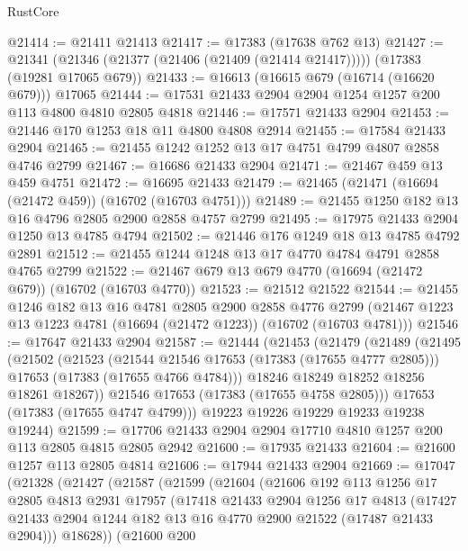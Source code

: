 \begin{lexlean}{RustCore}
\begin{coremodule}
@21414 := @21411 @21413
@21417 := @17383 (@17638 @762 @13)
@21427 := @21341 (@21346 (@21377 (@21406 (@21409 (@21414 @21417))))) (@17383 (@19281 @17065 @679))
@21433 := @16613 (@16615 @679 (@16714 (@16620 @679))) @17065
@21444 := @17531 @21433 @2904 @2904 @1254 @1257 @200 @113 @4800 @4810 @2805 @4818
@21446 := @17571 @21433 @2904
@21453 := @21446 @170 @1253 @18 @11 @4800 @4808 @2914
@21455 := @17584 @21433 @2904
@21465 := @21455 @1242 @1252 @13 @17 @4751 @4799 @4807 @2858 @4746 @2799
@21467 := @16686 @21433 @2904
@21471 := @21467 @459 @13 @459 @4751
@21472 := @16695 @21433
@21479 := @21465 (@21471 (@16694 (@21472 @459)) (@16702 (@16703 @4751)))
@21489 := @21455 @1250 @182 @13 @16 @4796 @2805 @2900 @2858 @4757 @2799
@21495 := @17975 @21433 @2904 @1250 @13 @4785 @4794
@21502 := @21446 @176 @1249 @18 @13 @4785 @4792 @2891
@21512 := @21455 @1244 @1248 @13 @17 @4770 @4784 @4791 @2858 @4765 @2799
@21522 := @21467 @679 @13 @679 @4770 (@16694 (@21472 @679)) (@16702 (@16703 @4770))
@21523 := @21512 @21522
@21544 := @21455
    @1246
    @182
    @13
    @16
    @4781
    @2805
    @2900
    @2858
    @4776
    @2799
    (@21467 @1223 @13 @1223 @4781 (@16694 (@21472 @1223)) (@16702 (@16703 @4781)))
@21546 := @17647 @21433 @2904
@21587 := @21444
    (@21453
      (@21479
        (@21489
          (@21495
            (@21502
              (@21523
                (@21544 @21546 @17653 (@17383 (@17655 @4777 @2805)))
                @17653
                (@17383 (@17655 @4766 @4784)))
              @18246
              @18249
              @18252
              @18256
              @18261
              @18267))
          @21546
          @17653
          (@17383 (@17655 @4758 @2805)))
        @17653
        (@17383 (@17655 @4747 @4799)))
      @19223
      @19226
      @19229
      @19233
      @19238
      @19244)
@21599 := @17706 @21433 @2904 @2904 @17710 @4810 @1257 @200 @113 @2805 @4815 @2805 @2942
@21600 := @17935 @21433
@21604 := @21600 @1257 @113 @2805 @4814
@21606 := @17944 @21433 @2904
@21669 := @17047
    (@21328
      (@21427
        (@21587
          (@21599
            (@21604
              (@21606
                @192
                @113
                @1256
                @17
                @2805
                @4813
                @2931
                @17957
                (@17418
                  @21433
                  @2904
                  @1256
                  @17
                  @4813
                  (@17427 @21433 @2904 @1244 @182 @13 @16 @4770 @2900 @21522 (@17487 @21433 @2904)))
                @18628))
            (@21600
              @200

\end{coremodule}
\end{lexlean}
